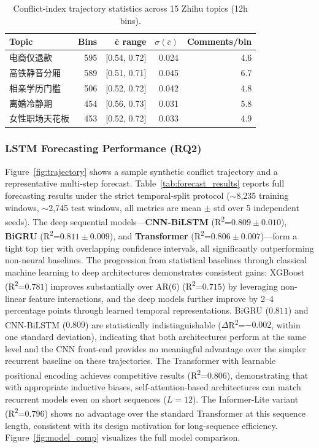 \documentclass[journal]{IEEEtran}
\begin{document}
\begin{table}[H]
\caption{Conflict-index trajectory statistics across 15 Zhihu topics (12h bins).}\label{tab:trajectory_stats}
\centering
\begin{tabular}{lrrrr}
\toprule
\textbf{Topic} & \textbf{Bins} & $\mathbf{\bar{c}}$ \textbf{range} & $\sigma(\bar{c})$ & \textbf{Comments/bin} \\
\midrule
电商仅退款 & 595 & [0.54, 0.72] & 0.024 & 4.6 \\
高铁静音分厢 & 589 & [0.51, 0.71] & 0.045 & 6.7 \\
相亲学历门槛 & 506 & [0.52, 0.72] & 0.042 & 4.8 \\
离婚冷静期 & 454 & [0.56, 0.73] & 0.031 & 5.8 \\
女性职场天花板 & 453 & [0.52, 0.72] & 0.033 & 4.9 \\
\bottomrule
\end{tabular}
\end{table}

\subsubsection{LSTM Forecasting Performance (RQ2)}

Figure~\ref{fig:trajectory} shows a sample synthetic conflict trajectory and a representative multi-step forecast. Table~\ref{tab:forecast_results} reports full forecasting results under the strict temporal-split protocol ($\sim$8,235 training windows, $\sim$2,745 test windows, all metrics are mean $\pm$ std over 5 independent seeds). The deep sequential models---\textbf{CNN-BiLSTM} (R\textsuperscript{2}=$0.809\pm0.010$), \textbf{BiGRU} (R\textsuperscript{2}=$0.811\pm0.009$), and \textbf{Transformer} (R\textsuperscript{2}=$0.806\pm0.007$)---form a tight top tier with overlapping confidence intervals, all significantly outperforming non-neural baselines. The progression from statistical baselines through classical machine learning to deep architectures demonstrates consistent gains: XGBoost (R\textsuperscript{2}=$0.781$) improves substantially over AR(6) (R\textsuperscript{2}=$0.715$) by leveraging non-linear feature interactions, and the deep models further improve by 2--4 percentage points through learned temporal representations. BiGRU ($0.811$) and CNN-BiLSTM ($0.809$) are statistically indistinguishable ($\Delta$R\textsuperscript{2}=$-0.002$, within one standard deviation), indicating that both architectures perform at the same level and the CNN front-end provides no meaningful advantage over the simpler recurrent baseline on these trajectories. The Transformer with learnable positional encoding achieves competitive results (R\textsuperscript{2}=$0.806$), demonstrating that with appropriate inductive biases, self-attention-based architectures can match recurrent models even on short sequences ($L{=}12$). The Informer-Lite variant (R\textsuperscript{2}=$0.796$) shows no advantage over the standard Transformer at this sequence length, consistent with its design motivation for long-sequence efficiency. Figure~\ref{fig:model_comp} visualizes the full model comparison.
\end{document}
